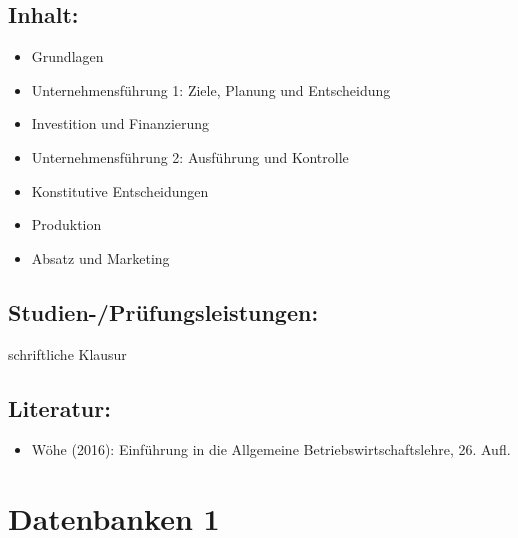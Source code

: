 \section*{Inhalt:}\label{inhalt-6}

\begin{itemize}
\item
  Grundlagen
\item
  Unternehmensführung 1: Ziele, Planung und Entscheidung
\item
  Investition und Finanzierung
\item
  Unternehmensführung 2: Ausführung und Kontrolle
\item
  Konstitutive Entscheidungen
\item
  Produktion
\item
  Absatz und Marketing
\end{itemize}

\section*{Studien-/Prüfungsleistungen:}\label{studien-pruxfcfungsleistungen-5}

schriftliche Klausur

\section*{Literatur:}\label{literatur-4}

\begin{itemize}
\tightlist
\item
  Wöhe (2016): Einführung in die Allgemeine Betriebswirtschaftslehre,
  26. Aufl.
\end{itemize}

\chapter{Datenbanken 1}\label{datenbanken-1}


